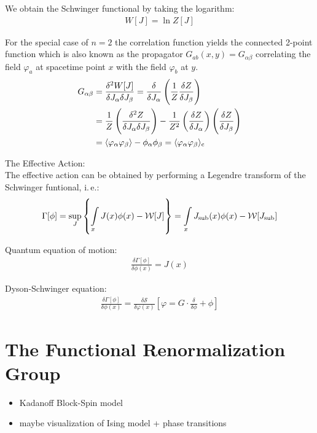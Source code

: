 We obtain the Schwinger functional by taking the logarithm:
\begin{align}
	W[J] = \ln Z[J]
\end{align}

For the special case of $n=2$ the correlation function yields the connected 2-point function which is also known as the propagator $G_{ab}(x,y) = G_{\alpha\beta}$ correlating the field $\varphi_a$ at spacetime point $x$ with the field $\varphi_b$ at $y$.
\begin{align}
	G_{\alpha\beta} &= \frac{\delta^2W[J]}{\delta J_{\alpha}\delta J_{\beta}} = \frac{\delta}{\delta J_{\alpha}}\left(\frac{1}{Z}\frac{\delta Z}{\delta J_{\beta}}\right) \nonumber \\
				&= \frac{1}{Z}\left(\frac{\delta^2Z}{\delta J_{\alpha}\delta J_{\beta}}\right) - \frac{1}{Z^2}\left(\frac{\delta Z}{\delta J_{\alpha}}\right)\left(\frac{\delta Z}{\delta J_{\beta}}\right)\\
				&= \langle \varphi_{\alpha}\varphi_{\beta} \rangle - \phi_{\alpha}\phi_{\beta} = \langle \varphi_{\alpha}\varphi_{\beta} \rangle_{\text{c}}	\nonumber	
\end{align}

The Effective Action:\\

The effective action can be obtained by performing a Legendre transform of the Schwinger funtional, i.\,e.:
\begin{align}
\Gamma[\phi] = \underset{J}{\operatorname{sup}}\left\{ \int\limits_x J(x)\phi(x) - \mathcal{W}[J] \right\} = \int\limits_x J_{\text{sub}}(x)\phi(x) - \mathcal{W}[J_{\text{sub}}]
\end{align}

Quantum equation of motion:
\begin{align}
\frac{\delta\Gamma[\phi]}{\delta\phi(x)} = J(x)	
\end{align}

Dyson-Schwinger equation:
\begin{align}
\frac{\delta\Gamma[\phi]}{\delta\phi(x)} = \frac{\delta\mathcal{S}}{\delta\varphi(x)} \left[\varphi = G \cdot \frac{\delta}{\delta\phi} + \phi \right]
\end{align}

\section{The Functional Renormalization Group}
\begin{itemize}
	\item Kadanoff Block-Spin model 
	\item maybe visualization of Ising model + phase transitions
\end{itemize}

